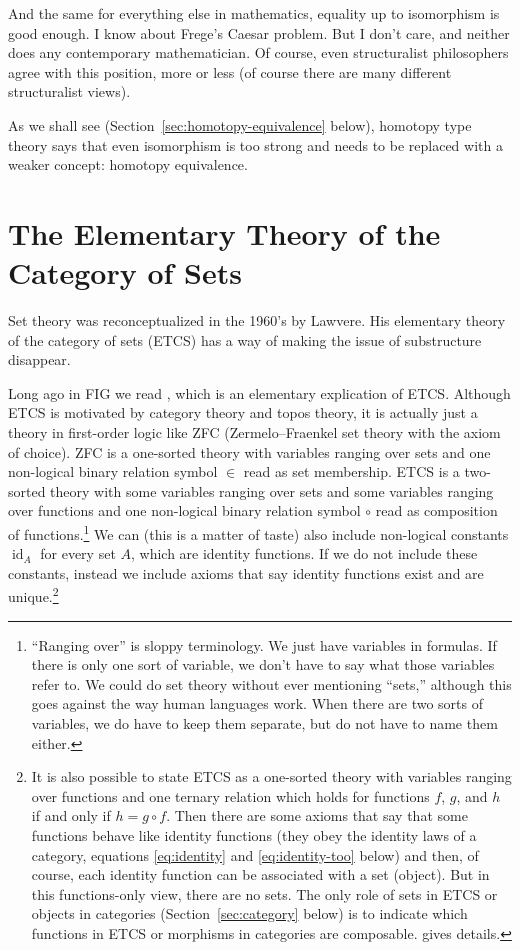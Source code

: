 \documentclass[11pt]{article}
\DeclareMathOperator{\idfun}{id}
\begin{document}
And the same for everything else in mathematics, equality up to isomorphism
is good enough.
I know about Frege's Caesar problem.  But I don't care, and neither does
any contemporary mathematician.
Of course, even structuralist philosophers agree with this position, more
or less (of course there are many different structuralist views).

As we shall see (Section~\ref{sec:homotopy-equivalence} below),
homotopy type theory says that even isomorphism is too strong and
needs to be replaced with a weaker concept: homotopy equivalence.

\section{The Elementary Theory of the Category of Sets}

Set theory was reconceptualized in the 1960's by
Lawvere.  His elementary theory of the category of sets (ETCS)
\citep{lawvere-etcs}
has a way of making the issue of substructure disappear.

Long ago in FIG we read \citet{leinster}, which is an elementary
explication of ETCS.  Although ETCS is motivated by category theory
and topos theory, it
is actually just a theory in first-order logic like ZFC
(Zermelo–Fraenkel set theory with the axiom of choice).  ZFC is a one-sorted
theory with variables ranging over sets and one non-logical binary relation
symbol $\in$ read as set membership.  ETCS is a two-sorted
theory with some variables ranging over sets and some variables ranging over
functions and one non-logical binary relation
symbol $\circ$ read as composition of functions.\footnote{``Ranging over''
is sloppy terminology.  We just have variables in formulas.  If there is only
one sort of variable, we don't have to say what those variables refer to.
We could do set theory without ever mentioning ``sets,'' although this
goes against the way human languages work.
When there are two sorts of variables,
we do have to keep them separate, but do not have to name them either.}
We can (this is a matter of taste) also include non-logical constants
$\idfun_A$ for every set $A$, which are identity functions.
If we do not include these constants,
instead we include axioms that say identity functions exist and
are unique.\footnote{It is also possible to state ETCS as a one-sorted
theory with variables ranging over functions and one ternary relation
which holds for functions $f$, $g$, and $h$ if and only if $h = g \circ f$.
Then there are some axioms that
say that some functions behave like identity functions (they obey the identity
laws of a category, equations \eqref{eq:identity} and \eqref{eq:identity-too}
below) and then, of course, each identity function can be associated with
a set (object).  But in this functions-only view, there are no sets.  The
only role of sets in ETCS or objects in categories (Section~\ref{sec:category}
below) is to indicate which functions in ETCS or morphisms in categories
are composable.  \citet[p.~9]{maclane-working}
gives details.\label{foot:arrows-only}}
\end{document}
